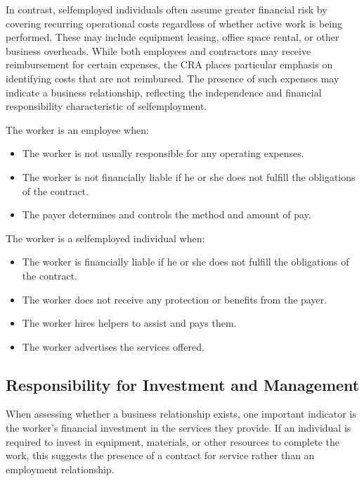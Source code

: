 \documentclass[letterpaper,10pt,english]{sphinxmanual}
\begin{document}
\sphinxAtStartPar
In contrast, self\sphinxhyphen{}employed individuals often assume greater financial risk by covering recurring operational costs
regardless of whether active work is being performed. These may include equipment leasing, office space rental, or other
business overheads. While both employees and contractors may receive reimbursement for certain expenses, the CRA places
particular emphasis on identifying costs that are not reimbursed. The presence of such expenses may indicate a business
relationship, reflecting the independence and financial responsibility characteristic of self\sphinxhyphen{}employment.

\sphinxAtStartPar
The worker is an employee when:
\begin{itemize}
\item {} 
\sphinxAtStartPar
The worker is not usually responsible for any operating expenses.

\item {} 
\sphinxAtStartPar
The worker is not financially liable if he or she does not fulfill the obligations of the contract.

\item {} 
\sphinxAtStartPar
The payer determines and controls the method and amount of pay.

\end{itemize}

\sphinxAtStartPar
The worker is a self\sphinxhyphen{}employed individual when:
\begin{itemize}
\item {} 
\sphinxAtStartPar
The worker is financially liable if he or she does not fulfill the obligations of the contract.

\item {} 
\sphinxAtStartPar
The worker does not receive any protection or benefits from the payer.

\item {} 
\sphinxAtStartPar
The worker hires helpers to assist and pays them.

\item {} 
\sphinxAtStartPar
The worker advertises the services offered.

\end{itemize}


\subsection{Responsibility for Investment and Management}
\label{\detokenize{compliance:responsibility-for-investment-and-management}}
\sphinxAtStartPar
When assessing whether a business relationship exists, one important indicator is the worker’s financial investment in the
services they provide. If an individual is required to invest in equipment, materials, or other resources to complete the
work, this suggests the presence of a contract for service rather than an employment relationship.
\end{document}
